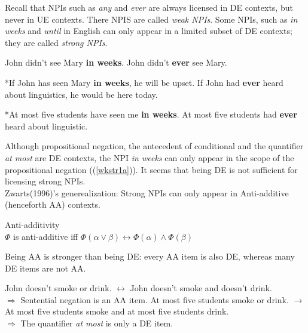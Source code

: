 \documentclass[a4paper,11pt]{article}
\newcommand{\reff}[1]{(\ref{#1})}
\begin{document}
Recall that NPIs such as \textit{any} and \textit{ever} are always licensed in DE contexts, but never in UE contexts. There NPIS are called \textit{weak NPIs}. Some NPIs, such as \textit{in weeks} and \textit{until} in English can only appear in a limited subset of DE contexts; they are called \textit{strong NPIs}.
\begin{exe}
\ex\label{wkstr} \begin{xlist}
\ex\label{wkstr1} \begin{xlist}
\ex\label{wkstr1a} John didn't see Mary \textbf{in weeks}. 
\ex\label{wkstr1b} John didn't \textbf{ever} see Mary. 
\end{xlist}
\ex\label{wkstr2} \begin{xlist}
\ex\label{wkstr2a} *If John has seen Mary \textbf{in weeks}, he will be upset.
\ex\label{wkstr2b} If John had \textbf{ever} heard about linguistics, he would be here today.
\end{xlist}
\ex\label{wkstr3} \begin{xlist}
\ex\label{wkstr3a} *At most five students have seen me \textbf{in weeks}.
\ex\label{wkstr3b} At most five students had \textbf{ever} heard about linguistic.
\end{xlist}
\end{xlist}
\end{exe}
Although propositional negation, the antecedent of conditional and the quantifier \textit{at most} are DE contexts, the NPI \textit{in weeks} can only appear in the scope of the propositional negation (\reff{wkstr1a}). It seems that being DE is not sufficient for licensing strong NPIs.
\\Zwarts(1996)'s generealization: Strong NPIs can only appear in Anti-additive (henceforth AA) contexts. 
\begin{exe}
\ex\label{aa} Anti-additivity \\$\Phi$ is anti-additive iff $\Phi(\alpha\vee\beta) \leftrightarrow \Phi(\alpha)\wedge \Phi(\beta)$
\end{exe}
Being AA is stronger than being DE: every AA item is also DE, whereas many DE items are not AA.
\begin{exe}
\ex\label{aa1} \begin{xlist}
\ex\label{aaneg} John doesn't smoke or drink. $\leftrightarrow$ John doesn't smoke and doesn't drink.
\\$\Rightarrow$ Sentential negation is an AA item.
\ex\label{aaatmost} At most five students smoke or drink. $\rightarrow$ At most five students smoke and at most five students drink.
\\$\Rightarrow$ The quantifier \textit{at most} is only a DE item.
\end{xlist}
\end{exe}
\end{document}
